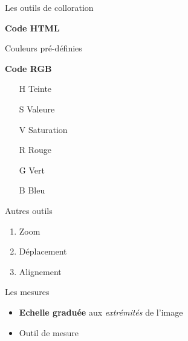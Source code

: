\documentclass[10pt,svgnames,usenames,table]{beamer}
\begin{document}
\begin{frame}{Les outils de colloration}
\begin{minipage}[t]{0.49\textwidth}
	\textbf{Code HTML}
	
	\vspace{0.2cm}
	Couleurs pré-définies
	
	\vspace{0.2cm}
	
	\begin{center}
	\end{center}

\end{minipage}\hfill
\begin{minipage}[t]{0.49\textwidth}
	\textbf{Code RGB}
	
	\begin{itemize}
		\item[H] Teinte
		\item[S] Valeure 
		\item[V] Saturation
		\item[R] Rouge
		\item[G] Vert 
		\item[B] Bleu
	\end{itemize}
	
\end{minipage}

\end{frame}



\begin{frame}{Autres outils}
\begin{enumerate}
	\item Zoom 
	\item Déplacement 
	\item Alignement 
\end{enumerate}
\end{frame}

\begin{frame}{Les mesures}
\begin{itemize}
	\item \textbf{Echelle graduée} aux \textit{extrémités} de l'image
	\item Outil de mesure 
\end{itemize}
\end{frame}
\end{document}
